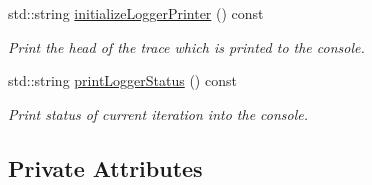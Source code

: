 \begin{DoxyCompactItemize}
$$std\+::string \mbox{\hyperlink{classlogger_1_1_logger_oob_risk_ac8b1b8a148878c38b1206fb00e0263f4}{initialize\+Logger\+Printer}} () const
\begin{DoxyCompactList}\small\item\em Print the head of the trace which is printed to the console. \end{DoxyCompactList}\item 
std\+::string \mbox{\hyperlink{classlogger_1_1_logger_oob_risk_a446e3e0c3766c8cda1add83c09d2e968}{print\+Logger\+Status}} () const
\begin{DoxyCompactList}\small\item\em Print status of current iteration into the console. \end{DoxyCompactList}\end{DoxyCompactItemize}
\subsection*{Private Attributes}
